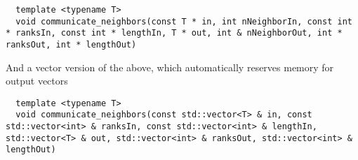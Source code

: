 \begin{mybox}
\begin{lstlisting}
  template <typename T>
  void communicate_neighbors(const T * in, int nNeighborIn, const int * ranksIn, const int * lengthIn, T * out, int & nNeighborOut, int * ranksOut, int * lengthOut)
\end{lstlisting}
\end{mybox}
\noindent
And a vector version of the above, which automatically reserves memory for output vectors
\begin{mybox}
\begin{lstlisting}
  template <typename T>
  void communicate_neighbors(const std::vector<T> & in, const std::vector<int> & ranksIn, const std::vector<int> & lengthIn, std::vector<T> & out, std::vector<int> & ranksOut, std::vector<int> & lengthOut)
\end{lstlisting}
\end{mybox}



